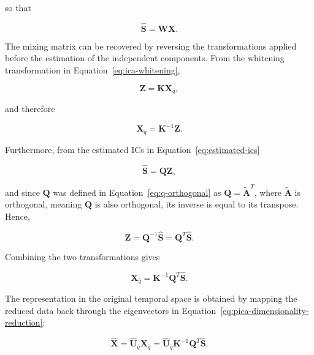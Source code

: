 \documentclass[english]{pwr_wmat_praca_dyplomowa}
\theoremstyle{definition}
\theoremstyle{remark}
\begin{document}
so that 

\begin{equation}
    \widehat{\mathbf{S}} = \mathbf{W}\mathbf{X}.
\end{equation}

The mixing matrix can be recovered by reversing the transformations applied before the estimation of the independent components. From the whitening transformation in Equation~\eqref{eq:ica-whitening},

\begin{equation}
    \mathbf{Z} = \mathbf{K}\mathbf{X}_{\widehat{q}},
\end{equation}

and therefore

\begin{equation}
    \mathbf{X}_{\widehat{q}} = \mathbf{K}^{-1}\mathbf{Z}.
\end{equation}

Furthermore, from the estimated ICs in Equation~\eqref{eq:estimated-ics}

\begin{equation}
    \widehat{\mathbf{S}} = \mathbf{Q}\mathbf{Z},
\end{equation}

and since $\mathbf{Q}$ was defined in Equation~\eqref{eq:q-orthogonal} as $\mathbf{Q} = \widetilde{\mathbf{A}}^T$, where $\widetilde{\mathbf{A}}$ is orthogonal, meaning $\mathbf{Q}$ is also orthogonal, its inverse is equal to its transpose. Hence,

\begin{equation}
    \mathbf{Z} = \mathbf{Q}^{-1}\widehat{\mathbf{S}} = \mathbf{Q}^T\widehat{\mathbf{S}}.
\end{equation}

Combining the two transformations gives 

\begin{equation}
    \mathbf{X}_{\widehat{q}} = \mathbf{K}^{-1}\mathbf{Q}^T\widehat{\mathbf{S}}.
\end{equation}

The representation in the original temporal space is obtained by mapping the reduced data back through the eigenvectors in Equation~\eqref{eq:pica-dimensionality-reduction}:

\begin{equation}
    \widehat{\mathbf{X}} = \widehat{\mathbf{U}}_{\widehat{q}}\mathbf{X}_{\widehat{q}}
    = \widehat{\mathbf{U}}_{\widehat{q}}\mathbf{K}^{-1}\mathbf{Q}^T\widehat{\mathbf{S}}.
\end{equation}
\end{document}

